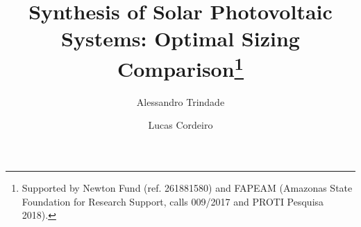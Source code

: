 \documentclass[runningheads]{llncs}
\begin{document}
%
\title{Synthesis of Solar Photovoltaic Systems: Optimal Sizing Comparison\thanks{Supported by Newton Fund (ref. 261881580) and FAPEAM (Amazonas State Foundation for Research Support, calls 009/2017 and PROTI Pesquisa 2018).}}
%
%
\author{Alessandro Trindade \and
Lucas Cordeiro}
%
%
\maketitle              %
\end{document}
